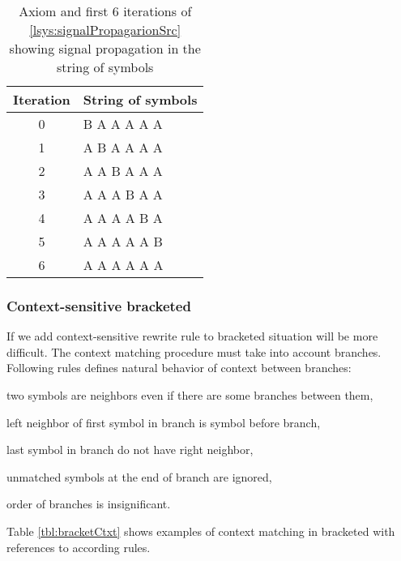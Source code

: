 \begin{table}[ht]
	\centering
	\begin{tabular}{c l}
   		\toprule
   		Iteration & String of symbols \\
   		\midrule
		0 & B A A A A A \\
		1 & A B A A A A \\
		2 & A A B A A A \\
		3 & A A A B A A \\
		4 & A A A A B A \\
		5 & A A A A A B \\
		6 & A A A A A A \\
		\bottomrule
	\end{tabular}
	\caption{Axiom and first 6 iterations of \lsystem \ref{lsys:signalPropagarionSrc} showing signal propagation in the string of symbols}
	\label{fig:signalPropagarion}
\end{table}


\subsubsection{Context-sensitive bracketed \lsystems}

If we add context-sensitive rewrite rule to bracketed \lsystems situation will be more difficult.
The context matching procedure must take into account branches.
Following rules defines natural behavior of context between branches:
\begin{enumerate*}
	\item \label{enum:ctxRule1} two symbols are neighbors even if there are some branches between them,
	\item \label{enum:ctxRule2} left neighbor of first symbol in branch is symbol before branch,
	\item \label{enum:ctxRule3} last symbol in branch do not have right neighbor,
	\item \label{enum:ctxRule4} unmatched symbols at the end of branch are ignored,
	\item \label{enum:ctxRule5} order of branches is insignificant.
\end{enumerate*}

Table \ref{tbl:bracketCtxt} shows examples of context matching in bracketed \lsystems with references to according rules.

